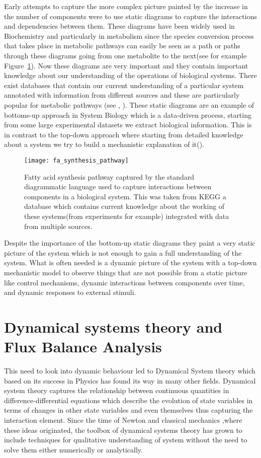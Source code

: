 Early attempts to capture the more complex picture painted by the
increase in the number of components were to use static diagrams to
capture the interactions and dependencies between them. These diagrams
have been widely used in Biochemistry and particularly in metabolism
since the species conversion process that takes place in metabolic
pathways can easily be seen as a path or paths through these diagrams going from
one metabolite to the next(see for example
Figure~\ref{fig:fa_synthesis_pathway}). Now these diagrams are very important and
they contain important knowledge about our understanding of the
operations of biological systems. There exist databases that contain our current
understanding of a particular system annotated with information from
different sources and these are particularly popular for metabolic
pathways (see \citet{kanehisa2000kegg},
\citet{pharkya2003review}). These static diagrams are an example of
bottoms-up approach in System Biology which is a data-driven process,
starting from some large experimental datasets we extract biological
information. This is in contrast to the top-down approach where
starting from detailed knowledge about a system we try to build a
mechanistic explanation of it(\citet{schneider2013understanding}). 

\begin{figure}[htbp!] 
\centering    
\texttt{[image: fa\_synthesis\_pathway]}
\caption[Fatty Acid synthesis pathway]{Fatty acid synthesis pathway
  captured by the standard diagrammatic language used to capture
  interactions between components in a biological system. This was
  taken from KEGG a database which contains current knowledge about
  the working of these systems(from experiments for example)
  integrated with data from multiple sources.}
\label{fig:fa_synthesis_pathway}
\end{figure}

Despite the importance of the bottom-up static diagrams they paint a
very static picture of the system which is not enough to gain a full
understanding of the system. What is often needed is a dynamic picture
of the system with a top-down mechanistic model to observe things that
are not possible from a static
picture like control mechanisms, dynamic interactions between
components over time, and dynamic responses to external stimuli.


\section{Dynamical systems theory and Flux Balance Analysis}
This need to look into dynamic behaviour led to Dynamical System
theory which based on its success in Physics has found its way in many
other fields. Dynamical system theory captures the relationship
between continuous quantities in difference-differential equations
which describe the evolution of state variables in terms of changes
in other state variables and even themselves thus capturing the
interaction element. Since the time of Newton and classical mechanics
,where these ideas originated, the toolbox of dynamical systems theory
has grown to include techniques for qualitative understanding of
system without the need to solve them either numerically or
analytically. 

